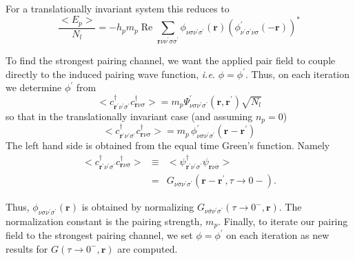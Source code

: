 For a translationally invariant system this reduces to
\begin{equation}
\frac{<E_p>}{N_l}  =  - 
h_p m_p\;\textrm{Re } \sum_{\mathbf{r}\nu\nu^{\prime}\sigma\sigma^{\prime}}
    \phi_{\nu\sigma\nu^{\prime}\sigma^{\prime}}(\mathbf{r}) 
\left(\phi^{\prime}_{\nu^{\prime}\sigma^{\prime}\nu\sigma}(-\mathbf{r})\right)^* 
\end{equation}

To find the strongest pairing channel, we want the applied
pair field to couple directly to the induced pairing wave function,
\textit{i.e.} $\phi = \phi^{\prime}$.  Thus, on each iteration
we determine $\phi^{\prime}$ from
\begin{equation}
<c^{\dagger}_{\mathbf{r}^{\prime}\nu^{\prime}\sigma^{\prime}} 
c^{\dagger}_{\mathbf{r}\nu\sigma}> = 
m_p \Psi^{\prime}_{\nu\sigma\nu^{\prime}\sigma^{\prime}}(\mathbf{r},\mathbf{r}^{\prime}) \sqrt{N_l}
\end{equation}
so that in the translationally invariant case (and assuming
$n_p = 0$)
\begin{equation} 
<c^{\dagger}_{\mathbf{r}^{\prime}\nu^{\prime}\sigma^{\prime}} 
c^{\dagger}_{\mathbf{r}\nu\sigma}>  =  m_p 
\,\phi_{\nu\sigma\nu^{\prime}\sigma^{\prime}}^{\prime}(\mathbf{r} -
\mathbf{r}^{\prime}) 
\end{equation}
The left hand side is obtained from the equal time Green's
function.  Namely
\begin{eqnarray} 
<c^{\dagger}_{\mathbf{r}^{\prime}\nu^{\prime}\sigma^{\prime}} 
c^{\dagger}_{\mathbf{r}\nu\sigma}> & \equiv &
<\psi^{\dagger}_{\mathbf{r}^{\prime}\nu^{\prime}\sigma^{\prime}}
\psi_{\mathbf{r}\nu\overline{\sigma}}> \\
& = & 
G_{\nu\overline{\sigma}\nu^{\prime}\sigma^{\prime}}(\mathbf{r}-\mathbf{r}^{\prime},
\tau \to 0-).
\end{eqnarray}

Thus, $\phi_{\nu\sigma\nu^{\prime}\sigma^{\prime}}(\mathbf{r})$ 
is obtained by normalizing  
$G_{\nu\overline{\sigma}\nu^{\prime}\sigma^{\prime}}(\tau \to 0^-, \mathbf{r})$.
The normalization constant is the pairing strength, $m_p$.
Finally, to iterate our pairing field 
to the strongest pairing channel, we set
$\phi = \phi^{\prime}$ on each iteration
as new results for $G(\tau \to 0^-, \mathbf{r})$
are computed.  
